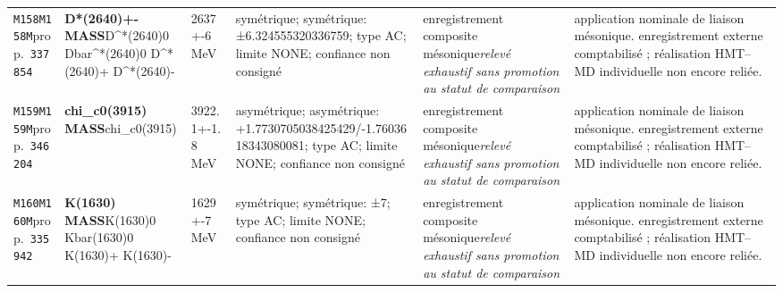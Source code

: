 \begin{landscape}
\begin{longtable}{L{1.85cm}L{4.45cm}L{2.35cm}L{4.05cm}L{3.35cm}L{7.15cm}}
\texttt{M158}\newline \texttt{M158M}\newline prop.\ \texttt{337854} & \textbf{D*(2640)+- MASS}\newline D\textasciicircum{}*(2640)0 \textbar{}\allowbreak{} Dbar\textasciicircum{}*(2640)0 \textbar{}\allowbreak{} D\textasciicircum{}*(2640)+ \textbar{}\allowbreak{} D\textasciicircum{}*(2640)- & 2637+-6\,MeV & symétrique; symétrique: ±6.324555320336759; type AC; limite NONE; confiance non consigné & enregistrement composite mésonique\newline \emph{relevé exhaustif sans promotion au statut de comparaison} & application nominale de liaison mésonique. enregistrement externe comptabilisé ; réalisation HMT--MD individuelle non encore reliée. \\
\texttt{M159}\newline \texttt{M159M}\newline prop.\ \texttt{346204} & \textbf{chi\_\allowbreak{}c0(3915) MASS}\newline chi\_\allowbreak{}c0(3915) & 3922.1+-1.8\,MeV & asymétrique; asymétrique: +1.7730705038425429/-1.7603618343080081; type AC; limite NONE; confiance non consigné & enregistrement composite mésonique\newline \emph{relevé exhaustif sans promotion au statut de comparaison} & application nominale de liaison mésonique. enregistrement externe comptabilisé ; réalisation HMT--MD individuelle non encore reliée. \\
\texttt{M160}\newline \texttt{M160M}\newline prop.\ \texttt{335942} & \textbf{K(1630) MASS}\newline K(1630)0 \textbar{}\allowbreak{} Kbar(1630)0 \textbar{}\allowbreak{} K(1630)+ \textbar{}\allowbreak{} K(1630)- & 1629+-7\,MeV & symétrique; symétrique: ±7; type AC; limite NONE; confiance non consigné & enregistrement composite mésonique\newline \emph{relevé exhaustif sans promotion au statut de comparaison} & application nominale de liaison mésonique. enregistrement externe comptabilisé ; réalisation HMT--MD individuelle non encore reliée. \\

\end{longtable}
\end{landscape}
